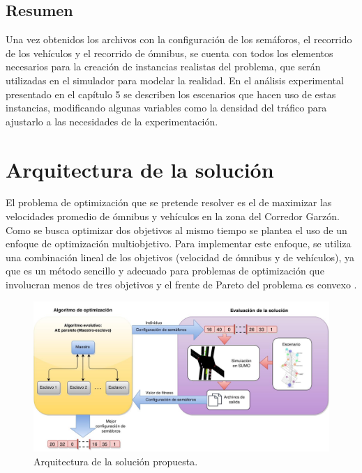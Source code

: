 \subsection{Resumen}

Una vez obtenidos los archivos con la configuración de los semáforos, el recorrido de los vehículos y el recorrido de ómnibus, se cuenta con todos los elementos necesarios para la creación de instancias realistas del problema, que serán utilizadas en el simulador para modelar la realidad.  En el análisis experimental presentado en el capítulo 5 se describen los escenarios que hacen uso de estas instancias, modificando algunas variables como la densidad del tráfico para ajustarlo a las necesidades de la experimentación.



\section{Arquitectura de la solución}


El problema de optimización que se pretende resolver es el de maximizar las velocidades promedio de ómnibus y vehículos en la zona del Corredor Garzón. Como se busca optimizar dos objetivos al mismo tiempo se plantea el uso de un enfoque de optimización multiobjetivo. Para implementar este enfoque, se utiliza una combinación lineal de los objetivos (velocidad de ómnibus y de vehículos), ya que es un método sencillo y adecuado para problemas de optimización que involucran menos de tres objetivos y el frente de Pareto del problema es convexo \citep{coello2002evolutionary}.



\begin{figure}[H]
	\centering
	\includegraphics[width=0.99\linewidth]{Figures/arquitectura1}
	\caption{Arquitectura de la solución propuesta.}
	\label{fig:arquitectura1}
\end{figure}

